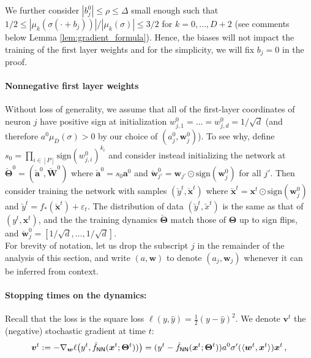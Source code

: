\documentclass[11pt]{article}
\newcommand{\eps}{\varepsilon}
\newcommand{\<}{\langle}
\renewcommand{\>}{\rangle}
\newcommand{\sign}{\text{sign}}
\theoremstyle{definition}
\def\bW{{\boldsymbol W}}
\def\ba{{\boldsymbol a}}
\def\bv{{\boldsymbol v}}
\def\bw{{\boldsymbol w}}
\def\bx{{\boldsymbol x}}
\def\bTheta{{\boldsymbol \Theta}}
\def\hf{{\hat f}}
\def\NN{{\sf NN}}
\def\NN{{\sf NN}}
\def\bv{{\boldsymbol v}}
\def\bTheta{{\boldsymbol \Theta}}
\def\NN{{\sf NN}}
\def\bw{{\boldsymbol w}}
\def\bx{{\boldsymbol x}}
\def\bW{{\boldsymbol W}}
\def\ba{{\boldsymbol a}}
\def\bTheta{{\boldsymbol \Theta}}
\def\hf{\hat f}
\def\eps{\varepsilon}
\newcommand{\fNN}{\hf_{\NN}}
\begin{document}
We further consider $|b_j^0| \leq \rho \leq \Delta $ small enough such that $1/2 \leq |\mu_k(\sigma ( \cdot + b_j))|/ |\mu_k (\sigma) | \leq 3/2$ for $k=0, \ldots , D+2$ (see comments below Lemma \ref{lem:gradient_formula}). Hence, the biases will not impact the training of the first layer weights and for the simplicity, we will fix $b_j = 0$ in the proof.


\paragraph{Nonnegative first layer weights} Without loss of generality, we assume that all of the first-layer coordinates of neuron $j$ have positive sign at initialization $w_{j,1}^0 = \ldots = w_{j,d}^0 = 1/\sqrt{d}$ (and therefore $a^0 \mu_D (\sigma)>0$ by our choice of $(a_j^0, \bw_j^0)$). 
To see why, define $s_0 = \prod_{i \in [P]} \sign (w_{j,i}^0)^{k_i}$ and consider instead initializing the network at $\breve{\bTheta}^0 = (\breve{\ba}^0, \breve{\bW}^0)$ where $\breve{\ba}^0 = s_0 \ba^0$ and $\breve{\bw}_{j'}^0 = \bw_{j'} \odot \sign(\bw_j^0)$ for all $j'$. Then consider training the network with samples $(\breve{y}^t,\breve{\bx}^t)$ where $\breve{\bx}^t = \bx^t \odot \sign(\bw_j^0)$ and $\breve{y}^t = f_*(\breve{\bx}^t) + \eps_t$. The distribution of data $(\breve{y}^t,\breve{x}^t)$ is the same as that of $(y^t,\bx^t)$, and the the training dynamics $\breve{\bTheta}$ match those of $\bTheta$ up to sign flips, and $\breve{\bw}_j^0 = [1/\sqrt{d}, \ldots, 1/\sqrt{d}]$.
\\

For brevity of notation, let us drop the subscript $j$ in the remainder of the analysis of this section, and 
write $(a,\bw)$ to denote $(a_j,\bw_j)$ whenever it can be inferred from context. 


\paragraph*{Stopping times on the dynamics:} Recall that the loss is the square loss $\ell(y,\hat y) = \frac{1}{2} (y - \hat y)^2$. We denote $\bv^t$ the (negative) stochastic gradient at time $t$:
\begin{align*}
\bv^t := -  \nabla_\bw \ell \big(y^t, \hf_\NN(\bx^t;\bTheta^t)) \big) = (y^t - \fNN(\bx^t;\bTheta^t)) a^0 \sigma' (\< \bw^t , \bx^t \>) \bx^t \, ,
\end{align*}
\end{document}
